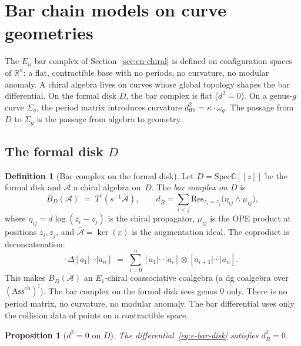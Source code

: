 \documentclass[11pt,reqno]{amsart}
\newtheorem{proposition}[theorem]{Proposition}
\theoremstyle{definition}
\newtheorem{definition}[theorem]{Definition}
\theoremstyle{remark}
\providecommand{\cA}{\mathcal{A}}
\providecommand{\Eone}{E_1}
\providecommand{\En}{E_n}
\providecommand{\barB}{\bar{B}}
\providecommand{\bC}{\mathbb{C}}
\providecommand{\bR}{\mathbb{R}}
\providecommand{\Res}{\mathrm{Res}}
\providecommand{\chirAss}{\mathrm{Ass}^{\mathrm{ch}}}
\providecommand{\Spec}{\mathrm{Spec}}
\begin{document}

\section{Bar chain models on curve geometries}
\label{sec:bar-chain-models}

The $\En$ bar complex of Section~\ref{sec:en-chiral} is defined
on configuration spaces of $\bR^n$: a flat, contractible base
with no periods, no curvature, no modular anomaly. A chiral
algebra lives on curves whose global topology shapes the bar
differential. On the formal disk $D$, the bar complex is flat
($d^2 = 0$). On a genus-$g$ curve $\Sigma_g$, the period matrix
introduces curvature $d_{\mathrm{fib}}^2 = \kappa \cdot \omega_g$.
The passage from $D$ to $\Sigma_g$ is the passage from algebra
to geometry.

\subsection{The formal disk $D$}

\begin{definition}[Bar complex on the formal disk]
\label{def:e-bar-disk}
Let $D = \Spec\bC[[z]]$ be the formal disk and $\cA$ a chiral
algebra on~$D$. The \emph{bar complex on $D$} is
\begin{equation}\label{eq:e-bar-disk}
\barB_D(\cA) \;=\; T^c(s^{-1}\bar{\cA}),
\qquad
d_{\barB} = \sum_{i < j}
\Res_{z_i = z_j}\!
\bigl(\eta_{ij} \wedge \mu_{ij}\bigr),
\end{equation}
where $\eta_{ij} = d\log(z_i - z_j)$ is the chiral propagator,
$\mu_{ij}$ is the OPE product at positions $z_i, z_j$, and
$\bar{\cA} = \ker(\varepsilon)$ is the augmentation ideal.
The coproduct is deconcatenation:
\[
\Delta[a_1|\cdots|a_n]
\;=\;
\sum_{i=0}^{n} [a_1|\cdots|a_i]
\otimes [a_{i+1}|\cdots|a_n].
\]
This makes $\barB_D(\cA)$ an $\Eone$-chiral coassociative
coalgebra (a dg coalgebra over $(\chirAss)^!$).
The bar complex on the formal disk sees genus $0$ only. There
is no period matrix, no curvature, no modular anomaly. The bar
differential uses only the collision data of points on a
contractible space.
\end{definition}

\begin{proposition}[$d^2 = 0$ on $D$]
\label{prop:e-bar-disk-d2}
The differential~\eqref{eq:e-bar-disk} satisfies $d_{\barB}^2 = 0$.
\end{proposition}
\end{document}
